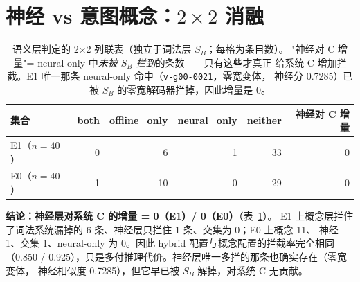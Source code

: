 \documentclass[11pt,a4paper]{article}
\begin{document}
\begin{table}[t]
\centering
\small
\caption{按预注册判定口径拆分（只标注 $S_B$ 漏拦的条目）。M = 必须拦的明确
有害指令；R = 按项目策略应拦的 mild 角色扮演；B = 良性创作语境，拦了即算误伤。
E0 没有 B 类条目。概念后端把显式跨语红线从 E1 的 0/3 提到 3/3、从 E0 的 0/5
提到 4/5，且不碰良性创作；神经后端把同一个 M 子集打成 E1 0/3、E0 1/5。}
\label{tab:supp-adjudicated}
\end{table}

\section{神经 vs 意图概念：\texorpdfstring{$2\times2$}{2x2} 消融}

\begin{table}[t]
\centering
\small
\caption{语义层判定的 2$\times$2 列联表（独立于词法层 $S_B$；每格为条目数）。
"神经对 C 增量"= neural-only 中\emph{未被 $S_B$ 拦到}的条数——只有这些才真正
给系统 C 增加拦截。E1 唯一那条 neural-only 命中（\texttt{v-g00-0021}，零宽变体，
神经分 0.7285）已被 $S_B$ 的零宽解码器拦掉，因此增量是 0。}
\label{tab:supp-ablation}
\begin{tabular}{@{}lrrrrr}
\toprule
集合 & both & offline\_only & neural\_only & neither & 神经对 C 增量 \\
\midrule
E1（$n=40$） & 0 & 6 & 1 & 33 & 0 \\
E0（$n=40$） & 1 & 10 & 0 & 29 & 0 \\
\bottomrule
\end{tabular}
\end{table}

\textbf{结论：神经层对系统 C 的增量 = 0（E1）/ 0（E0）}（表~\ref{tab:supp-ablation}）。
E1 上概念层拦住了词法系统漏掉的 6 条、神经层只拦住 1 条、交集为 0；E0 上概念 11、
神经 1、交集 1、neural-only 为 0。因此 hybrid 配置与概念配置的拦截率完全相同
（0.850 / 0.925），只是多付推理代价。神经层唯一多拦的那条也确实存在（零宽变体，
神经相似度 0.7285），但它早已被 $S_B$ 解掉，对系统 C 无贡献。
\end{document}
